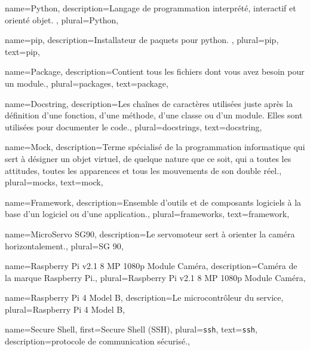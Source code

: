 {
    name={Python},
    description={Langage de programmation interprété, interactif et orienté objet. \cite{python}},
    plural={Python},
}

{
    name={pip},
    description={Installateur de \glspl{paquet} pour \gls{python}. \cite{pip}},
    plural={pip},
    text={pip},
}

{
    name={Package},
    description={Contient tous les fichiers dont vous avez besoin pour un module.},
    plural={packages},
    text={package},
}

{
    name={Docstring},
    description={Les chaînes de caractères utilisées juste après la définition d'une fonction, d'une méthode, d'une
            classe ou d'un module. Elles sont utilisées pour documenter le code.},
    plural={docstrings},
    text={docstring},
}

{
    name={Mock},
    description={Terme spécialisé de la programmation informatique qui sert à désigner un objet virtuel, de quelque
            nature que ce soit, qui a toutes les attitudes, toutes les apparences et tous les mouvements de son double
            réel.},
    plural={mocks},
    text={mock},
}

{
    name={Framework},
    description={Ensemble d'outils et de composants logiciels à la base d'un logiciel ou d'une application.},
    plural={frameworks},
    text={framework},
}

{
    name={MicroServo SG90},
    description={Le servomoteur sert à orienter la caméra horizontalement.},
    plural={SG 90},
}

{
    name={Raspberry Pi v2.1 8 MP 1080p Module Caméra},
    description={Caméra de la marque Raspberry Pi.},
    plural={Raspberry Pi v2.1 8 MP 1080p Module Caméra},
}

{
    name={Raspberry Pi 4 Model B},
    description={Le microcontrôleur du service},
    plural={Raspberry Pi 4 Model B},
}

{
    name={Secure Shell},
    first={Secure Shell (SSH)},
    plural={\texttt{ssh}},
    text={\texttt{ssh}},
    description={protocole de communication sécurisé.},
}